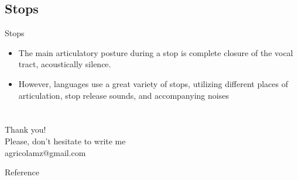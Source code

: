\subsection{Stops}
\begin{frame}{Stops}
\begin{itemize}
\item The main articulatory posture during a stop is complete closure of the vocal tract, acoustically silence. 
\item However, languages use a great variety of stops, utilizing different places of articulation, stop release sounds, and accompanying noises
\end{itemize}
\end{frame}
\section{}
\begin{frame}
{\huge Thank you!\bigskip\\
\normalsize Please, don't hesitate to write me\\
agricolamz@gmail.com
\vspace{-130pt}}
\end{frame}
\begin{frame}{Reference}
\footnotesize


\end{frame}

